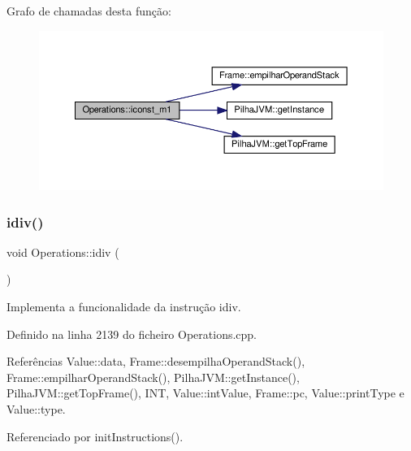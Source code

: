 Grafo de chamadas desta função\+:\nopagebreak
\begin{figure}[H]
\begin{center}
\leavevmode
\includegraphics[width=350pt]{classOperations_abb57552d42047d4b685b2d68db6b1fd7_cgraph}
\end{center}
\end{figure}
\mbox{\label{classOperations_a5bf24c3cc02a8282c21a37cd7b7ba5d3}} 
\subsubsection{\texorpdfstring{idiv()}{idiv()}}
{\footnotesize\ttfamily void Operations\+::idiv (\begin{DoxyParamCaption}{ }\end{DoxyParamCaption})\hspace{0.3cm}{\ttfamily [private]}}



Implementa a funcionalidade da instrução idiv. 



Definido na linha 2139 do ficheiro Operations.\+cpp.



Referências Value\+::data, Frame\+::desempilha\+Operand\+Stack(), Frame\+::empilhar\+Operand\+Stack(), Pilha\+J\+V\+M\+::get\+Instance(), Pilha\+J\+V\+M\+::get\+Top\+Frame(), I\+NT, Value\+::int\+Value, Frame\+::pc, Value\+::print\+Type e Value\+::type.



Referenciado por init\+Instructions().

